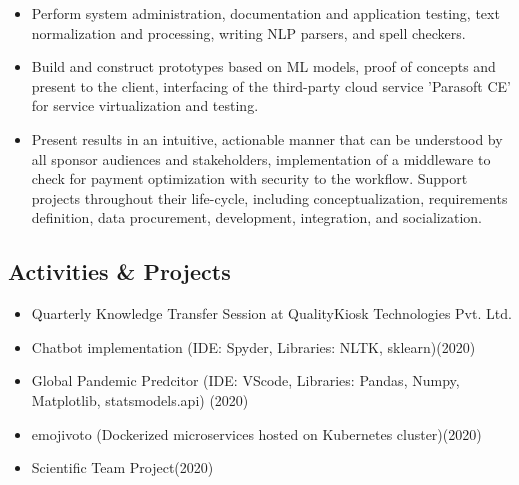 \documentclass[
]{article}
\providecommand{\tightlist}{%
  \setlength{\itemsep}{0pt}\setlength{\parskip}{0pt}}
\begin{document}
\begin{itemize}
\tightlist
\item
  Perform system administration, documentation and application testing,
  text normalization and processing, writing NLP parsers, and spell
  checkers.
\item
  Build and construct prototypes based on ML models, proof of concepts
  and present to the client, interfacing of the third-party cloud
  service 'Parasoft CE' for service virtualization and testing.
\item
  Present results in an intuitive, actionable manner that can be
  understood by all sponsor audiences and stakeholders, implementation
  of a middleware to check for payment optimization with security to the
  workflow. Support projects throughout their life-cycle, including
  conceptualization, requirements definition, data procurement,
  development, integration, and socialization.
\end{itemize}

\hypertarget{activities-projects}{%
\subsection{Activities \& Projects}\label{activities-projects}}

\begin{itemize}
\tightlist
\item
  Quarterly Knowledge Transfer Session at QualityKiosk Technologies Pvt.
  Ltd.
\item
  Chatbot implementation (IDE: Spyder, Libraries: NLTK, sklearn)(2020)
\item
  Global Pandemic Predcitor (IDE: VScode, Libraries: Pandas, Numpy,
  Matplotlib, statsmodels.api) (2020)
\item
  emojivoto (Dockerized microservices hosted on Kubernetes
  cluster)(2020)
\item
  Scientific Team Project(2020)
\end{itemize}
\end{document}
